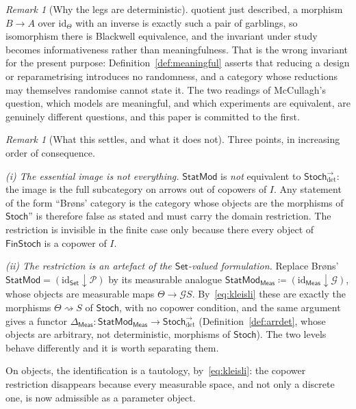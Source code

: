 \documentclass[11pt,a4paper]{article}
\theoremstyle{plain}
\theoremstyle{definition}
\theoremstyle{remark}
\newtheorem{remark}[theorem]{Remark}
\newtheorem{caveat}[theorem]{Remark}
\newcommand{\cat}[1]{\mathsf{#1}}
\newcommand{\Meas}{\cat{Meas}}
\newcommand{\Set}{\cat{Set}}
\newcommand{\Stoch}{\cat{Stoch}}
\newcommand{\FinStoch}{\cat{FinStoch}}
\newcommand{\G}{\mathcal{G}}
\newcommand{\Prb}{\mathcal{P}}
\newcommand{\id}{\mathrm{id}}
\newcommand{\StatMod}{\cat{StatMod}}
\newcommand{\Statk}{\StatMod_{\Meas}}
\newcommand{\Jcm}{\Delta_{\Meas}}
\newcommand{\Arrdet}[1]{#1^{\rightarrow}_{\det}}
\begin{document}
\begin{remark}[Why the legs are deterministic]
quotient just described, a morphism $B \to A$ over $\id_\Theta$ with an
inverse is exactly such a pair of garblings, so isomorphism there is
Blackwell equivalence, and the invariant under study becomes informativeness
rather than meaningfulness. That is the wrong invariant for the present purpose:
Definition~\ref{def:meaningful} asserts that reducing a design or
reparametrising introduces no randomness, and a category whose reductions may
themselves randomise cannot state it. The two readings of McCullagh's question,
which models are meaningful, and which experiments are equivalent, are
genuinely different questions, and this paper is committed to the first.
\end{remark}

\begin{caveat}[What this settles, and what it does not]\label{cav:Bscope}
Three points, in increasing order of consequence.

\emph{(i) The essential image is not everything.} $\StatMod$ is \emph{not}
equivalent to $\Arrdet{\Stoch}$: the image is the full subcategory on arrows
out of copowers of $I$. Any statement of the form ``Br\o ns' category
is the category whose objects are the morphisms of $\Stoch$'' is therefore
false as stated and must carry the domain restriction. The restriction is
invisible in the finite case only because there every object of $\FinStoch$ is
a copower of $I$.

\emph{(ii) The restriction is an artefact of the $\Set$-valued formulation.}
Replace Br\o ns' $\StatMod = (\id_{\Set}\downarrow\Prb)$ by its measurable
analogue $\Statk \coloneqq (\id_{\Meas}\downarrow\G)$, whose objects are
measurable maps $\Theta \to \G S$. By~\eqref{eq:kleisli} these are exactly the
morphisms $\Theta \rightsquigarrow S$ of $\Stoch$, with no copower condition,
and the same argument gives a functor
$\Jcm \colon \Statk \to \Arrdet{\Stoch}$
(Definition~\ref{def:arrdet}, whose objects are arbitrary, not
deterministic, morphisms of $\Stoch$). The two levels behave differently
and it is worth separating them.

On objects, the identification is a tautology, by~\eqref{eq:kleisli}: the
copower restriction disappears because every measurable space, and not only a
discrete one, is now admissible as a parameter object.


\end{caveat}
\end{document}
